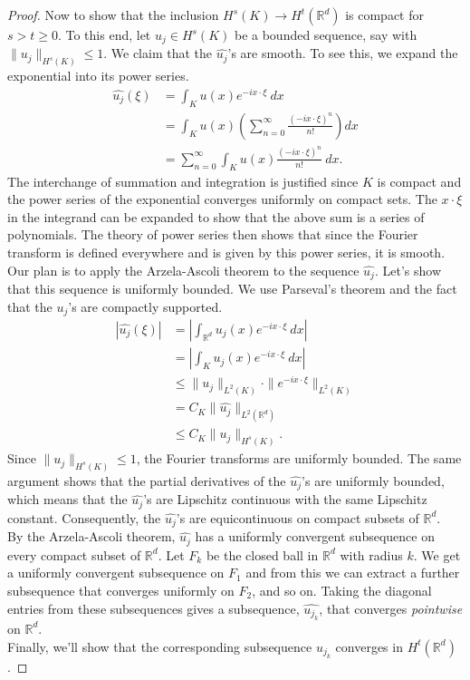 \documentclass[11pt,letterpaper]{report}
\newcommand{\reals}{\mathbb{R}}
\begin{document}
\begin{enumerate}[(a)]
\begin{proof}
		Now to show that the inclusion $H^s(K)\to H^t(\reals^d)$ is compact for $s>t\geq 0$. To this end, let $u_j\in H^s(K)$ be a bounded sequence, say with $\|u_j\|_{H^s(K)}\leq 1$. We claim that the $\widehat{u_j}$'s are smooth. To see this, we expand the exponential into its power series.
		\begin{align*}
		\widehat{u_j}(\xi) &= \int_Ku(x)e^{-ix\cdot \xi}\ dx\\
		&= \int_Ku(x)\left(\sum_{n=0}^\infty \frac{(-ix\cdot \xi)^n}{n!}\right)dx\\
		&= \sum_{n=0}^\infty \int_Ku(x)\frac{(-ix\cdot \xi)^n}{n!}\ dx.
		\end{align*}
		The interchange of summation and integration is justified since $K$ is compact and the power series of the exponential converges uniformly on compact sets. The $x\cdot \xi$ in the integrand can be expanded to show that the above sum is a series of polynomials. The theory of power series then shows that since the Fourier transform is defined everywhere and is given by this power series, it is smooth.\\

		Our plan is to apply the Arzela-Ascoli theorem to the sequence $\widehat{u_j}$. Let's show that this sequence is uniformly bounded. We use Parseval's theorem and the fact that the $u_j$'s are compactly supported.
		\begin{align*}
			|\widehat{u_j}(\xi)| &= \left|\int_{\reals^d}u_j(x)e^{-ix\cdot \xi}\ dx\right|\\
			&= \left|\int_Ku_j(x)e^{-ix\cdot \xi}\ dx\right|\\
			&\leq \|u_j\|_{L^2(K)}\cdot \|e^{-ix\cdot \xi}\|_{L^2(K)}\\
			&= C_K\|\widehat{u_j}\|_{L^2(\reals^d)}\\
			&\leq C_K\|u_j\|_{H^s(K)}.
		\end{align*}
		Since $\|u_j\|_{H^s(K)}\leq 1$, the Fourier transforms are uniformly bounded. The same argument shows that the partial derivatives of the $\widehat{u_j}$'s are uniformly bounded, which means that the $\widehat{u_j}$'s are Lipschitz continuous with the same Lipschitz constant. Consequently, the $\widehat{u_j}$'s are equicontinuous on compact subsets of $\reals^d$.\\

		By the Arzela-Ascoli theorem, $\widehat{u_j}$ has a uniformly convergent subsequence on every compact subset of $\reals^d$. Let $F_k$ be the closed ball in $\reals^d$ with radius $k$. We get a uniformly convergent subsequence on $F_1$ and from this we can extract a further subsequence that converges uniformly on $F_2$, and so on. Taking the diagonal entries from these subsequences gives a subsequence, $\widehat{u_{j_k}}$, that converges \textit{pointwise} on $\reals^d$.\\

		Finally, we'll show that the corresponding subsequence $u_{j_k}$ converges in $H^t(\reals^d)$.
	\end{proof}
\end{enumerate}
\end{document}
